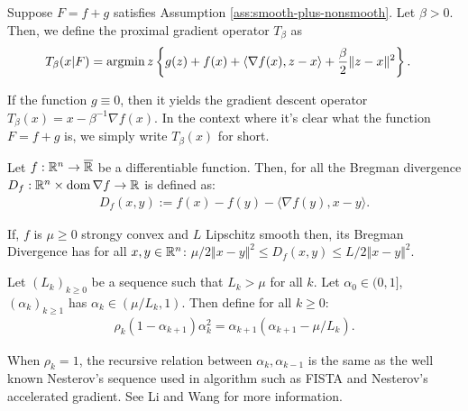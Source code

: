 \documentclass[12pt]{article}
\begin{document}
        \begin{definition}
            Suppose $F = f + g$ satisfies Assumption \ref{ass:smooth-plus-nonsmooth}. 
            Let $\beta > 0$. 
            Then, we define the proximal gradient operator $T_{\beta}$ as 
            \begin{align*}
                T_\beta (x | F) &= \mathop{\rm argmin}\limits{z} \left\lbrace
                    g(z) + f(x) + \langle \nabla f(x), z - x\rangle + \frac{\beta}{2}\Vert z - x\Vert^2
                \right\rbrace. 
            \end{align*}
        \end{definition}
        \begin{remark}
            If the function $g \equiv 0$, then it yields the gradient descent operator $T_\beta(x) = x - \beta^{-1}\nabla f(x)$. 
            In the context where it's clear what the function $F = f + g$ is, we simply write $T_\beta(x)$ for short. 
        \end{remark}

        \begin{definition}
            Let $f:\mathbb R^n \rightarrow \overline {\mathbb R}$ be a differentiable function. 
            Then, for all the Bregman divergence $D_f: \mathbb R^n \times \operatorname{dom}\nabla f \rightarrow \mathbb R$ is defined as: 
            \begin{align*}
                D_f(x, y) := f(x) - f(y) - \langle \nabla f(y), x - y\rangle. 
            \end{align*}
        \end{definition}
        \begin{remark}
            If, $f$ is $\mu \ge 0$ strongy convex and $L$ Lipschitz smooth then, its Bregman Divergence has for all $x, y \in \mathbb R^n$: $\mu/2 \Vert x - y\Vert^2 \le D_f(x, y) \le L/2 \Vert x - y\Vert^2$. 
        \end{remark}

        \begin{definition}\label{def:rwapg-seq}
            Let $(L_k)_{k \ge 0}$ be a sequence such that $L_k > \mu$ for all $k$. 
            Let $\alpha_0 \in (0, 1]$, $(\alpha_k)_{k \ge 1}$ has $\alpha_k \in (\mu/ L_k, 1)$. 
            Then define for all $k \ge 0$: 
            \begin{align*}
                \rho_k(1 - \alpha_{k + 1})\alpha_k^2 = \alpha_{k + 1}(\alpha_{k + 1} - \mu/L_k). 
            \end{align*}
        \end{definition}
        \begin{remark}
            When $\rho_k = 1$, the recursive relation between $\alpha_k, \alpha_{k - 1}$ is the same as the well known Nesterov's sequence used in algorithm such as FISTA and Nesterov's accelerated gradient. 
            See Li and Wang \cite{li_relaxed_2025} for more information. 
        \end{remark}
        
\end{document}
